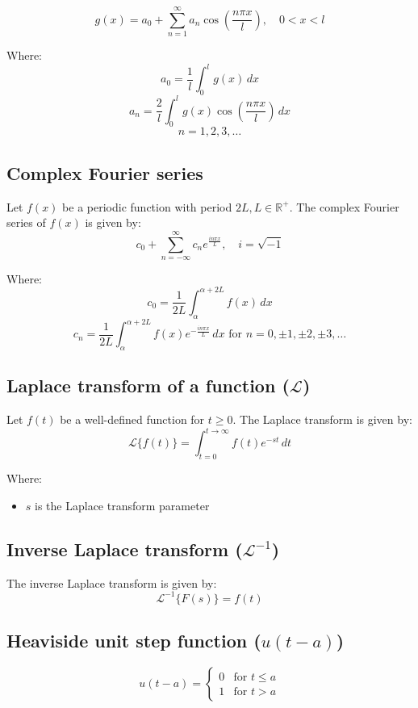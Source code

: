 \documentclass[11pt]{article}
\begin{document}
\[g(x) = a_0 + \sum_{n = 1}^{\infty} a_n \cos \left( \frac{n \pi x}{l} \right), \quad 0 < x < l\]

Where:
\[a_0 = \frac{1}{l} \int_0^l g(x) \, dx\]
\[a_n = \frac{2}{l} \int_0^l g(x) \cos \left( \frac{n \pi x}{l} \right) \, dx\]
\[n = 1, 2, 3, \ldots\]

 \newpage

\subsection{Complex Fourier series}
\label{sec:orgf0ff57f}
Let \(f(x)\) be a periodic function with period \(2L, L \in \mathbb{R}^{+}\). The complex Fourier series of \(f(x)\) is given by:
\[c_0 + \sum_{n = - \infty}^{\infty} c_n e^{\frac{i n \pi x}{L}}, \quad i = \sqrt{-1}\]

Where:
\[c_0 = \frac{1}{2L} \int_{\alpha}^{\alpha + 2L} f(x) \, dx\]
\[c_n = \frac{1}{2L} \int_{\alpha}^{\alpha + 2L} f(x) e^{- \frac{i n \pi x}{L}} \, dx \text{ for } n = 0, \pm 1, \pm 2, \pm 3, \ldots \]

\subsection{Laplace transform of a function (\(\mathcal{L}\))}
\label{sec:orgef293a1}
Let \(f(t)\) be a well-defined function for \(t \ge 0\). The Laplace transform is given by:
\[\mathcal{L} \{ f(t) \} = \int_{t = 0}^{t \rightarrow \infty} f(t) e^{-st} \, dt\]

Where:
\begin{itemize}
\item \(s\) is the Laplace transform parameter
\end{itemize}

\subsection{Inverse Laplace transform (\(\mathcal{L}^{-1}\))}
\label{sec:org6b88eb1}
The inverse Laplace transform is given by:
\[\mathcal{L}^{-1} \{ F(s) \} = f(t)\]

\subsection{Heaviside unit step function (\(u(t - a)\))}
\label{sec:orgfa6c689}
\label{orge4ee940}
\begin{displaymath}
u(t - a) = \begin{cases}
0 & \text{for } t \le a \\
1 & \text{for } t > a
\end{cases}
\end{displaymath}
\end{document}
